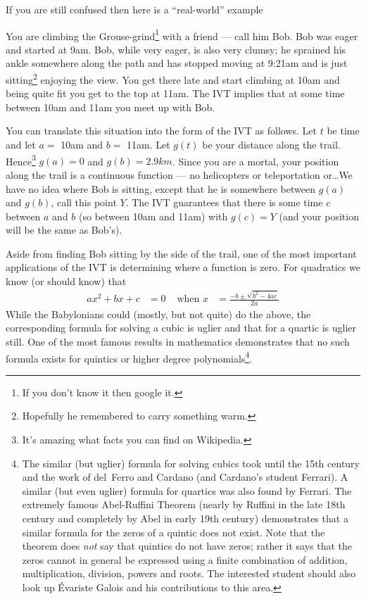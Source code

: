 If you are still confused then here is a ``real-world'' example
\begin{eg}\label{eg_1_6_4}
 You are climbing the Grouse-grind\footnote{If you don't know it then google
it.} with a friend --- call him Bob. Bob was eager and started at 9am. Bob,
while very eager, is also very clumsy; he sprained his ankle somewhere
along the path and has stopped moving at 9:21am and is just
sitting\footnote{Hopefully he remembered to carry something warm.} enjoying the
view. You get there late and start climbing at 10am and being quite fit you get to the
top at 11am. The IVT implies that at some time between 10am and 11am you
meet up with Bob.

You can translate this situation into the form of the IVT as follows. Let $t$
be time and let $a = $ 10am and $b=$ 11am. Let $g(t)$ be your distance
along the trail. Hence\footnote{It's amazing what facts you can find
on Wikipedia.} $g(a) = 0$ and
$g(b) = 2.9km$. Since you are a mortal, your position along the trail is a
continuous function --- no helicopters or teleportation or\dots We have no idea
where Bob is sitting, except that he is somewhere between $g(a)$ and
$g(b)$, call this point $Y$. The IVT guarantees that there is some time $c$
between $a$ and $b$ (so between 10am and 11am) with $g(c) = Y$ (and your
position will be the same as Bob's).
\end{eg}

Aside from finding Bob sitting by the side of the trail, one of the most
important applications of the IVT is determining where a function is zero. For
quadratics we know (or should know) that
\begin{align*}
  ax^2+bx+c &= 0 & \text{ when } x &= \frac{-b \pm \sqrt{b^2-4ac}}{2a}
\end{align*}
While the Babylonians could (mostly, but not quite) do the above, the corresponding
formula for solving a cubic is uglier and that for a quartic is uglier still. One of
the most famous results in mathematics demonstrates that no such
formula exists for quintics or higher degree polynomials\footnote{The similar
(but uglier) formula for solving cubics took until the 15th century and the
work of del~Ferro and Cardano (and Cardano's student Ferrari). A similar (but
even uglier) formula for quartics was also found by Ferrari. The extremely
famous  Abel-Ruffini Theorem (nearly by Ruffini in the late 18th century and
completely by Abel in early 19th century) demonstrates  that a similar formula
for the zeros of a quintic does not exist. Note that the theorem does
\emph{not} say that quintics do not have zeros; rather it says that the zeros
cannot in general be expressed using a finite combination of addition,
multiplication, division, powers and roots. The interested student should also
look up \'Evariste Galois and his contributions to this area.}.

